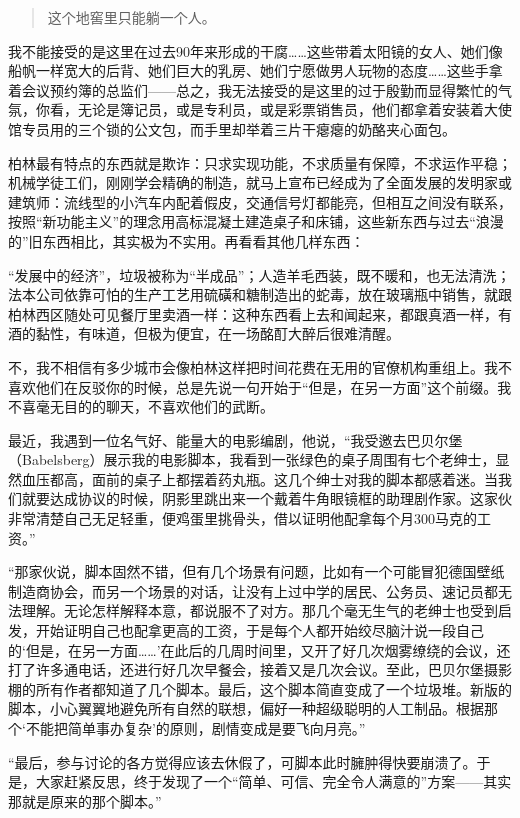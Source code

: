 \documentclass[UTF8]{ctexart}
\begin{document}
\begin{verse}
这个地窖里只能躺一个人。
\end{verse}

我不能接受的是这里在过去90年来形成的干腐……这些带着太阳镜的女人、她们像船帆一样宽大的后背、她们巨大的乳房、她们宁愿做男人玩物的态度……这些手拿着会议预约簿的总监们——总之，我无法接受的是这里的过于殷勤而显得繁忙的气氛，你看，无论是簿记员，或是专利员，或是彩票销售员，他们都拿着安装着大使馆专员用的三个锁的公文包，而手里却举着三片干瘪瘪的奶酪夹心面包。

柏林最有特点的东西就是欺诈：只求实现功能，不求质量有保障，不求运作平稳；机械学徒工们，刚刚学会精确的制造，就马上宣布已经成为了全面发展的发明家或建筑师：流线型的小汽车内配着假皮，交通信号灯都能亮，但相互之间没有联系，按照“新功能主义”的理念用高标混凝土建造桌子和床铺，这些新东西与过去“浪漫的”旧东西相比，其实极为不实用。再看看其他几样东西：

“发展中的经济”，垃圾被称为“半成品”；人造羊毛西装，既不暖和，也无法清洗；法本公司依靠可怕的生产工艺用硫磺和糖制造出的蛇毒，放在玻璃瓶中销售，就跟柏林西区随处可见餐厅里卖酒一样：这种东西看上去和闻起来，都跟真酒一样，有酒的黏性，有味道，但极为便宜，在一场酩酊大醉后很难清醒。

不，我不相信有多少城市会像柏林这样把时间花费在无用的官僚机构重组上。我不喜欢他们在反驳你的时候，总是先说一句开始于“但是，在另一方面”这个前缀。我不喜毫无目的的聊天，不喜欢他们的武断。

最近，我遇到一位名气好、能量大的电影编剧，他说，“我受邀去巴贝尔堡（Babelsberg）展示我的电影脚本，我看到一张绿色的桌子周围有七个老绅士，显然血压都高，面前的桌子上都摆着药丸瓶。这几个绅士对我的脚本都感着迷。当我们就要达成协议的时候，阴影里跳出来一个戴着牛角眼镜框的助理剧作家。这家伙非常清楚自己无足轻重，便鸡蛋里挑骨头，借以证明他配拿每个月300马克的工资。”

“那家伙说，脚本固然不错，但有几个场景有问题，比如有一个可能冒犯德国壁纸制造商协会，而另一个场景的对话，让没有上过中学的居民、公务员、速记员都无法理解。无论怎样解释本意，都说服不了对方。那几个毫无生气的老绅士也受到启发，开始证明自己也配拿更高的工资，于是每个人都开始绞尽脑汁说一段自己的‘但是，在另一方面……’在此后的几周时间里，又开了好几次烟雾缭绕的会议，还打了许多通电话，还进行好几次早餐会，接着又是几次会议。至此，巴贝尔堡摄影棚的所有作者都知道了几个脚本。最后，这个脚本简直变成了一个垃圾堆。新版的脚本，小心翼翼地避免所有自然的联想，偏好一种超级聪明的人工制品。根据那个‘不能把简单事办复杂’的原则，剧情变成是要飞向月亮。”

“最后，参与讨论的各方觉得应该去休假了，可脚本此时臃肿得快要崩溃了。于是，大家赶紧反思，终于发现了一个“简单、可信、完全令人满意的”方案——其实那就是原来的那个脚本。”
\end{document}
